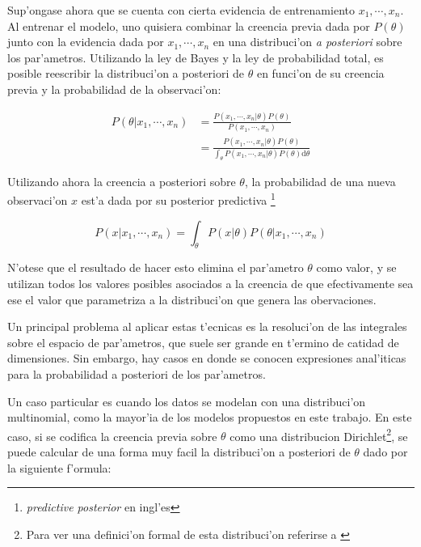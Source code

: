 Sup'ongase ahora que se cuenta con cierta evidencia de entrenamiento $x_1,\cdots,x_n$. Al entrenar el modelo, uno quisiera combinar la 
creencia previa dada por $P(\theta)$ junto con la evidencia dada por $x_1,\cdots,x_n$ en una distribuci'on \emph{a posteriori} sobre los par'ametros.
Utilizando la ley de Bayes y la ley de probabilidad total, es posible reescribir la distribuci'on a posteriori de $\theta$ en funci'on de su creencia previa y 
la probabilidad de la observaci'on:

\begin{align*}
P(\theta|x_1,\cdots,x_n) &= \frac{P(x_1,\cdots,x_n|\theta) P(\theta)}{P(x_1,\cdots,x_n)} \\
                         &= \frac{P(x_1,\cdots,x_n|\theta) P(\theta)}{\int_\theta{P(x_1,\cdots,x_n|\theta)P(\theta)\mathrm{d}\theta}}
\end{align*}

Utilizando ahora la creencia a posteriori sobre $\theta$, la probabilidad de una nueva observaci'on $x$ est'a dada por su posterior predictiva
\footnote{\emph{predictive posterior} en ingl'es}

$$P(x|x_1,\cdots,x_n) = \int_\theta{P(x|\theta)P(\theta|x_1,\cdots,x_n)}$$

N'otese que el resultado de hacer esto elimina el par'ametro $\theta$ como valor, y se utilizan todos los valores posibles asociados a la 
creencia de que efectivamente sea ese el valor que parametriza a la distribuci'on que genera las obervaciones.


Un principal problema al aplicar estas t'ecnicas es la resoluci'on de las integrales sobre el espacio de par'ametros, que suele ser grande en t'ermino
de catidad de dimensiones. 
Sin embargo, hay casos en donde se conocen expresiones anal'iticas para la probabilidad a posteriori de los par'ametros.


Un caso particular es cuando los datos se modelan con una distribuci'on multinomial, como la mayor'ia  de los modelos propuestos en este trabajo.
En este caso, si se codifica la creencia previa
sobre $\theta$ como una distribucion Dirichlet\footnote{Para ver una definici'on formal de esta distribuci'on referirse a \cite{minka2003dir}}, se puede calcular de una forma muy facil la distribuci'on a posteriori de $\theta$ dado por la siguiente
f'ormula:

